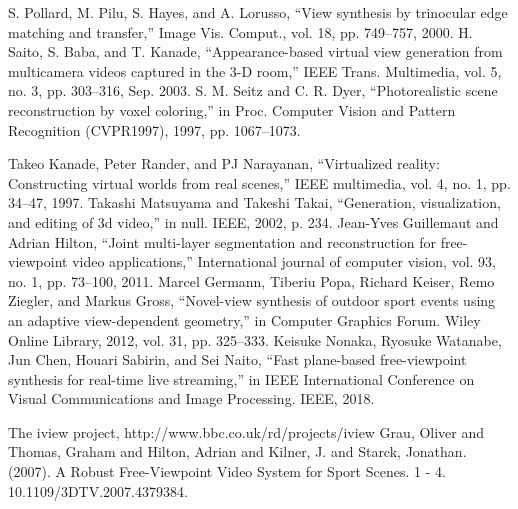 \begin{thebibliography}{00}
     S. Pollard, M. Pilu, S. Hayes, and A. Lorusso, “View synthesis by
    trinocular edge matching and transfer,” Image Vis. Comput., vol. 18,
    pp. 749–757, 2000.
     H. Saito, S. Baba, and T. Kanade, “Appearance-based virtual view
    generation from multicamera videos captured in the 3-D room,” IEEE
    Trans. Multimedia, vol. 5, no. 3, pp. 303–316, Sep. 2003.
     S. M. Seitz and C. R. Dyer, “Photorealistic scene reconstruction by
    voxel coloring,” in Proc. Computer Vision and Pattern Recognition
    (CVPR1997), 1997, pp. 1067–1073.
    
     Takeo Kanade, Peter Rander, and PJ Narayanan, “Virtualized reality:
    Constructing virtual worlds from real scenes,” IEEE multimedia, vol.
    4, no. 1, pp. 34–47, 1997.
     Takashi Matsuyama and Takeshi Takai, “Generation, visualization,
    and editing of 3d video,” in null. IEEE, 2002, p. 234.
     Jean-Yves Guillemaut and Adrian Hilton, “Joint multi-layer segmentation 
    and reconstruction for free-viewpoint video applications,”
    International journal of computer vision, vol. 93, no. 1, pp. 73–100,
    2011.
     Marcel Germann, Tiberiu Popa, Richard Keiser, Remo Ziegler, and
    Markus Gross, “Novel-view synthesis of outdoor sport events using
    an adaptive view-dependent geometry,” in Computer Graphics Forum.
    Wiley Online Library, 2012, vol. 31, pp. 325–333.
     Keisuke Nonaka, Ryosuke Watanabe, Jun Chen, Houari Sabirin, and
    Sei Naito, “Fast plane-based free-viewpoint synthesis for real-time
    live streaming,” in IEEE International Conference on Visual Communications 
    and Image Processing. IEEE, 2018.


     The iview project, http://www.bbc.co.uk/rd/projects/iview
     Grau, Oliver and Thomas, Graham and Hilton, Adrian and Kilner, J. and Starck, Jonathan. (2007). 
    A Robust Free-Viewpoint Video System for Sport Scenes. 1 - 4. 10.1109/3DTV.2007.4379384.
\end{thebibliography}

